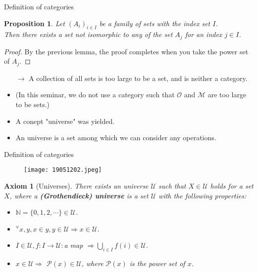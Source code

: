 \documentclass[dvipdfmx,10pt,notheorems]{beamer}
\newtheorem{axiom}[theorem]{Axiom}
\newtheorem{proposition}[theorem]{Proposition}
\renewcommand{\#}{^\sharp}
\begin{document}
	
	
	\begin{frame}{Definition of categories}
			\begin{proposition}
					Let $(A_i)_{i\in I}$ be a family of sets with the index set $I$.\\
					Then there exists a set not isomorphic to any of the set $A_j$ for an index $j\in I$.
			\end{proposition}
			\begin{proof}
					By the previous lemma,
					the proof completes when you take the power set of $A_j$.
			\end{proof}
			\begin{itemize}
					\item[$\rightarrow$] A collection of all sets is too large to be a set, and is neither a category.
					\item (In this seminar, we do not use a category such that $\mathcal{O}$ and $\mathcal{M}$ are
					too large to be sets.)
					\item A conept "universe" was yielded.
					\item An universe is a set among which we can consider any operations.
			\end{itemize}
	\end{frame}
	
	
	
	\begin{frame}{Definition of categories}
			\begin{figure}
					\texttt{[image: 19051202.jpeg]}
					\label{ImageOfTheUniverse}
			\end{figure}		
			\begin{axiom}[Universes]
					There exists an universe $\mathcal{U}$ such that $X\in\mathcal{U}$ holds for a set $X$,
					where
					a  {\bf (Grothendieck) universe} is a set $\mathcal{U}$  with the following properties:
							\begin{itemize}
									\item $\mathbb{N}=\{0,1,2,\cdots\}\in\mathcal{U}$.
									\item $^\forall x,y, x\in y, y\in\mathcal{U} \Rightarrow x\in\mathcal{U}$.
									\item $I\in\mathcal{U}, f:I\rightarrow \mathcal{U}:$a map
									$\Rightarrow \bigcup_{i\in I}f(i)\in\mathcal{U}$.
									\item $x\in\mathcal{U} \Rightarrow$ $\mathcal{P}(x)\in\mathcal{U}$,
									where $\mathcal{P}(x)$ is the power set of $x$.
							\end{itemize}
			\end{axiom}
	\end{frame}
\end{document}
